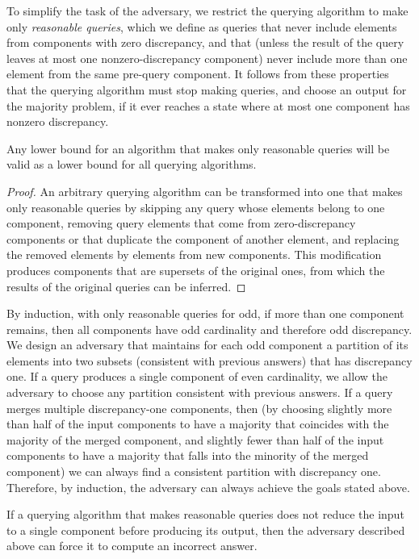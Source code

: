 \documentclass[11pt]{llncs}
\begin{document}
To simplify the task of the adversary, we restrict the querying algorithm to make only \emph{reasonable queries}, which we define as queries that never include elements from components with zero discrepancy, and that (unless the result of the query leaves at most one nonzero-discrepancy component) never include more than one element from the same pre-query component. It follows from these properties that the querying algorithm must stop making queries, and choose an output for the majority problem, if it ever reaches a state where at most one component has nonzero discrepancy.

\begin{lemma}
Any lower bound for an algorithm that makes only reasonable queries will be valid as a lower bound for all querying algorithms.
\end{lemma}

\begin{proof}
An arbitrary querying algorithm can be transformed into one that makes only reasonable queries by skipping any query whose elements belong to one component, removing query elements that come from zero-discrepancy components or that duplicate the component of another element, and replacing the removed elements by elements from new components. This modification produces components that are supersets of the original ones, from which the results of the original queries  can be inferred.
\end{proof}

By induction, with only reasonable queries for  odd, if more than one component remains, then all components have odd cardinality and therefore odd discrepancy. We design an adversary that maintains for each odd component a partition of its elements into two subsets (consistent with previous answers) that has discrepancy one. If a query produces a single component of even cardinality, we allow the adversary to choose any partition consistent with previous answers.
If a query merges multiple discrepancy-one components, then (by choosing slightly more than half of the input components to have a majority that coincides with the majority of the merged component, and slightly fewer than half of the input components to have a majority that falls into the minority of the merged component) we can always find a consistent partition with discrepancy one. Therefore, by induction, the adversary can always achieve the goals stated above.

\begin{lemma}
If a querying algorithm that makes reasonable queries does not reduce the input to a single component before producing its output, then the adversary described above can force it to compute an incorrect answer.
\end{lemma}
\end{document}
